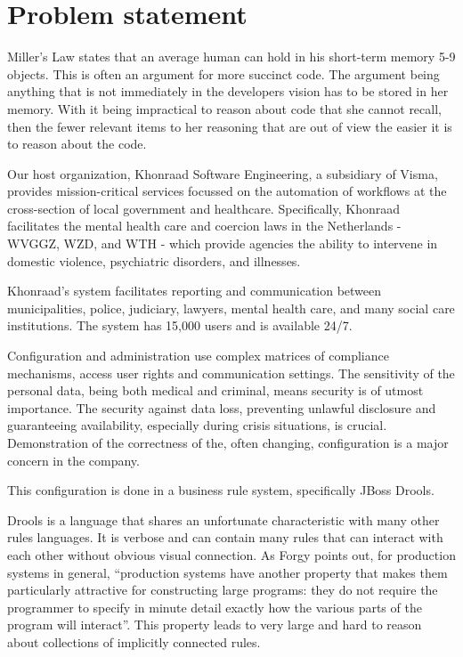 \section{Problem statement}

Miller's Law\cite{miller1956magical} states that an average human can hold in his short-term memory 5-9 objects.
This is often an argument for more succinct code.
The argument being anything that is not immediately in the developers vision has to be stored in her memory.
With it being impractical to reason about code that she cannot recall, then the fewer relevant items to her reasoning that are out of view the easier it is to reason about the code.

Our host organization, Khonraad Software Engineering, a subsidiary of Visma, provides mission-critical services focussed on the automation of workflows at the cross-section of local government and healthcare.
Specifically, Khonraad facilitates the mental health care and coercion laws in the Netherlands - WVGGZ, WZD, and WTH - which provide agencies the ability to intervene in domestic violence, psychiatric disorders, and illnesses.

Khonraad's system facilitates reporting and communication between municipalities, police, judiciary, lawyers, mental health care, and many social care institutions.
The system has 15,000 users and is available 24/7.

Configuration and administration use complex matrices of compliance mechanisms, access user rights and communication settings.
The sensitivity of the personal data, being both medical and criminal, means security is of utmost importance.
The security against data loss, preventing unlawful disclosure and guaranteeing availability, especially during crisis situations, is crucial.
Demonstration of the correctness of the, often changing, configuration is a major concern in the company.

This configuration is done in a business rule system, specifically JBoss Drools.

Drools is a language that shares an unfortunate characteristic with many other rules languages.
It is verbose and can contain many rules that can interact with each other without obvious visual connection.
As Forgy\cite{forgy1989rete} points out, for production systems in general, ``production systems have another property that makes them particularly attractive for constructing large programs: they do not require the programmer to specify in minute detail exactly how the various parts of the program will interact''.
This property leads to very large and hard to reason about collections of implicitly connected rules.

